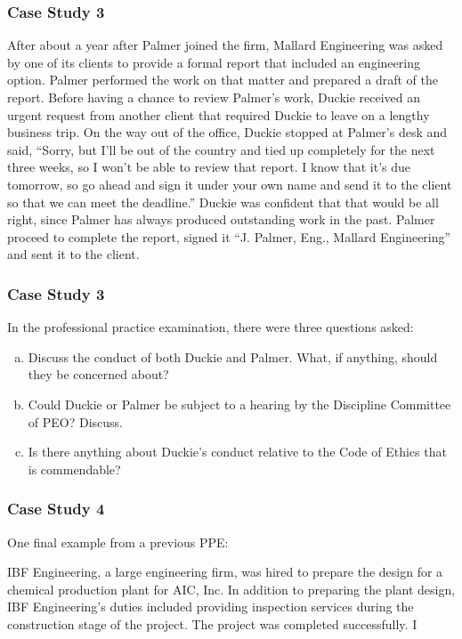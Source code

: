 \begin{frame}
\frametitle{Case Study 3}

After about a year after Palmer joined the firm, Mallard Engineering was asked by one of its clients to provide a formal report that included an engineering option.  Palmer performed the work on that matter and prepared a draft of the report.  Before having a chance to review Palmer's work, Duckie received an urgent request from another client that required Duckie to leave on a lengthy business trip.  On the way out of the office, Duckie stopped at Palmer's desk and said, ``Sorry, but I'll be out of the country and tied up completely for the next three weeks, so I won't be able to review that report.  I know that it's due tomorrow, so go ahead and sign it under your own name and send it to the client so that we can meet the deadline.''  Duckie was confident that that would be all right, since Palmer has always produced outstanding work in the past.  Palmer proceed to complete the report, signed it ``J. Palmer, Eng., Mallard Engineering'' and sent it to the client.


\end{frame}



\begin{frame}
\frametitle{Case Study 3}

In the professional practice examination, there were three questions asked: 
\begin{enumerate}[(a)]
\item Discuss the conduct of both Duckie and Palmer.  What, if anything, should they be concerned about?
\item Could Duckie or Palmer be subject to a hearing by the Discipline Committee of PEO?  Discuss.
\item Is there anything about Duckie's conduct relative to the Code of Ethics that is commendable?
\end{enumerate}

\end{frame}



\begin{frame}
\frametitle{Case Study 4}

One final example from a previous PPE:

IBF Engineering, a large engineering firm, was hired to prepare the design for a chemical production plant for AIC, Inc.  In addition to preparing the plant design, IBF Engineering's duties included providing inspection services during the construction stage of the project.  The project was completed successfully.
I

\end{frame}



